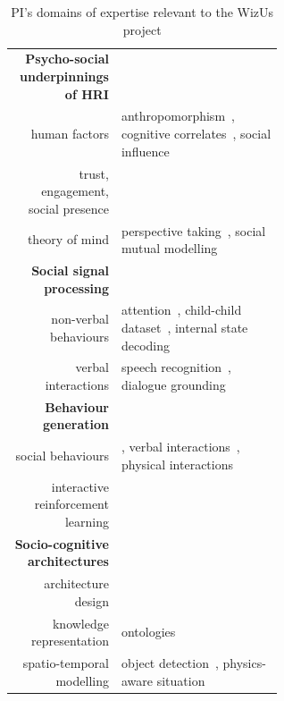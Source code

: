 \documentclass[11pt,a4paper]{report}
\newcommand{\project}{WizUs\xspace}
\begin{document}
\begin{table}[h]
    \centering
    \caption{\small PI's domains of expertise relevant to the \project project}
    \begin{tabular}{rp{0.6\linewidth}}
        \toprule
        \textbf{Psycho-social underpinnings of HRI} \\  
        human factors & \small anthropomorphism~\cite{lemaignan2014dynamics}, cognitive
        correlates~\cite{lemaignan2014cognitive}, social influence~\cite{winkle2019effective} \\
        trust, engagement, social presence & \small \cite{flook2019impact,lemaignan2015youre,fink2014which,irfan2018social} \\
        theory of mind & \small perspective taking~\cite{ros2010which, warnier2012when}, social mutual modelling~\cite{lemaignan2015mutual,dillenbourg2016symmetry} \\
        \midrule
        \textbf{Social signal processing}\\
        non-verbal behaviours & \small attention~\cite{lemaignan2016realtime},
        child-child dataset~\cite{lemaignan2018pinsoro}, internal state decoding~\cite{bartlett2019what} \\
        verbal interactions & \small speech recognition~\cite{kennedy2017child}, dialogue grounding~\cite{lemaignan2011grounding} \\
        \midrule
        \textbf{Behaviour generation} \\
        social behaviours & \small \cite{lallee2011towards}, verbal interactions~\cite{wallbridge2019generating, wallbridge2019towards}, physical interactions~\cite{gharbi2013natural} \\
        interactive reinforcement learning & \small \cite{senft2017leveraging,senft2017supervised, senft2019teaching} \\
        \midrule
        \textbf{Socio-cognitive architectures} \\
        architecture design & \small \cite{lemaignan2017artificial, baxter2016cognitive,lemaignan2014challenges,lallee2012towards, mallet2010genom3} \\
        knowledge representation & \small
        ontologies~\cite{lemaignan2010oro, lemaignan2013explicit} \\    
        spatio-temporal modelling & \small object
        detection~\cite{wallbridge2017qualitative}, physics-aware situation

\end{tabular}
\end{table}
\end{document}
